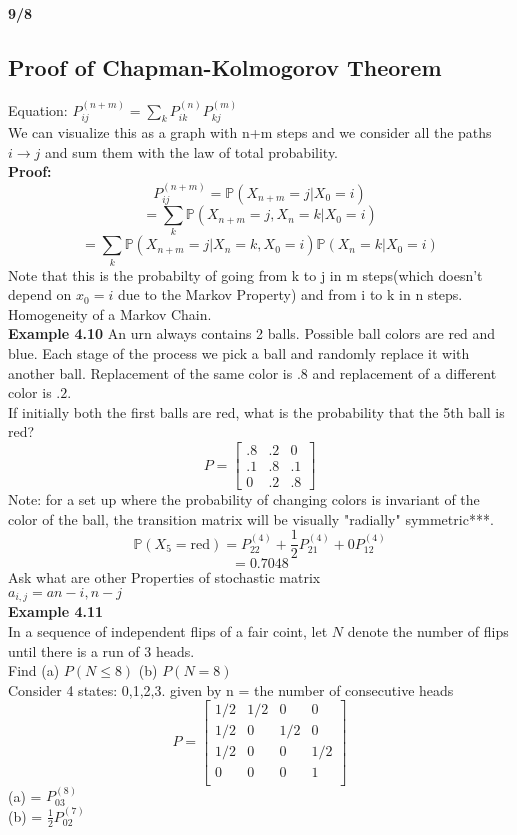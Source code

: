 \documentclass{article}
\newcommand{\ex}[1]{\textbf{Example #1}}
\begin{document}
\textbf{9/8}
\subsection*{Proof of Chapman-Kolmogorov Theorem}
Equation: $P_{ij}^{(n+m)} = \sum_{k} P_{ik}^{(n)} P_{kj}^{(m)}$\\
We can visualize this as a graph with n+m steps and we consider all the paths $i \rightarrow j$ and sum them with the law of total probability.\\
\textbf{Proof:}\\
$$ P_{ij}^{(n+m)} = \mathds{P}(X_{n+m} = j | X_0 = i)$$
$$ = \sum_{k} \mathds{P}(X_{n+m} = j, X_n = k | X_0 = i)$$
$$ = \sum_{k} \mathds{P}(X_{n+m} = j | X_n = k, X_0 = i) \mathds{P}(X_n = k | X_0 = i)$$
Note that this is the probabilty of going from k to j in m steps(which doesn't depend on $x_0 =i$ due to the Markov Property) and from i to k in n steps.\\
Homogeneity of a Markov Chain.\\
\textbf{Example 4.10} 
An urn always contains 2 balls. Possible ball colors are red and blue. Each stage of the process we pick a ball and randomly replace it with another ball. Replacement of the same color is $.8$ and replacement of a different color is $.2$.\\ 
If initially both the first balls are red, what is the probability that the 5th ball is red?\\   
$$P = \begin{bmatrix}
    .8 & .2 & 0 \\
    .1 & .8 & .1 \\
    0 & .2 & .8
\end{bmatrix}$$
Note: for a set up where the probability of changing colors is invariant of the color of the ball, the transition matrix will be visually "radially" symmetric***.\\
$$\mathds{P}(X_5 = \text{red} ) = P_{22}^{(4)}  + \frac{1}{2}P_{21}^{(4)} + 0P_{12}^{(4)}$$
$$ =0.7048 $$
Ask what are other Properties of stochastic matrix\\
$ a_{i,j} = a{n-i, n-j }$\\
\ex{4.11}\\
In a sequence of independent flips of a fair coint, let $N$ denote the number of flips until there is a run of 3 heads.\\
Find (a) $P(N \leq 8)$ (b) $P(N = 8)$\\
Consider 4 states: 0,1,2,3. given by n = the number of consecutive heads\\
$$P = \begin{bmatrix}
    1/2 & 1/2 & 0 & 0 \\
    1/2 & 0 & 1/2 & 0 \\
    1/2 & 0 & 0 & 1/2 \\
    0 & 0 & 0 & 1 \\
\end{bmatrix}$$
(a) = $P_{03}^{(8)}$\\
(b) = $\frac{1}{2} P_{02}^{(7)}$\\
\end{document}
